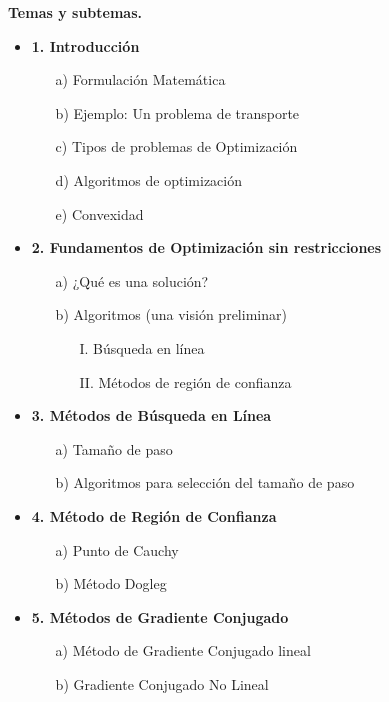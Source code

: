 \documentclass[10pt,a4paper]{article}
\begin{document}
\textbf{Temas y subtemas.}
\begin{itemize}
    \item \textbf{1. Introducción}
    \begin{itemize}
        \item[a)] Formulación Matemática
        \item[b)] Ejemplo: Un problema de transporte
        \item[c)] Tipos de problemas de Optimización
        \item[d)] Algoritmos de optimización
        \item[e)] Convexidad
    \end{itemize}

    \item \textbf{2. Fundamentos de Optimización sin restricciones}
    \begin{itemize}
        \item[a)] ¿Qué es una solución?
        \item[b)] Algoritmos (una visión preliminar)
        \begin{itemize}
            \item[I.] Búsqueda en línea
            \item[II.] Métodos de región de confianza
        \end{itemize}
    \end{itemize}

    \item \textbf{3. Métodos de Búsqueda en Línea}
    \begin{itemize}
        \item[a)] Tamaño de paso
        \item[b)] Algoritmos para selección del tamaño de paso
    \end{itemize}

    \item \textbf{4. Método de Región de Confianza}
    \begin{itemize}
        \item[a)] Punto de Cauchy
        \item[b)] Método Dogleg
    \end{itemize}

    \item \textbf{5. Métodos de Gradiente Conjugado}
    \begin{itemize}
        \item[a)] Método de Gradiente Conjugado lineal
        \item[b)] Gradiente Conjugado No Lineal
    \end{itemize}


\end{itemize}
\end{document}
